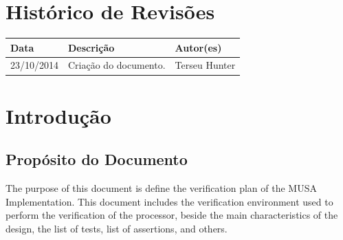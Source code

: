 \documentclass{article}
\begin{document}
\capa

  \section*{\center Histórico de Revisões}
  \vspace*{1cm}
  \begin{center} %
    \begin{longtable}[pos]{|m{2cm} | m{7.2cm} | m{3.8cm}|} 
      \hline %
      \cellcolor[gray]{0.9}
      \textbf{Data} & \cellcolor[gray]{0.9}\textbf{Descrição} & \cellcolor[gray]{0.9}\textbf{Autor(es)}\\ \hline
      \hline
      \small 23/10/2014 & \small Criação do documento. & \small Terseu Hunter \\ \hline 
    \end{longtable}
  \end{center}

  \newpage
  \tableofcontents
  \newpage

  \section{Introdução}

	\subsection{Propósito do Documento}
	The purpose of this document is define the verification plan of the MUSA Implementation. This document includes the verification environment used to perform the verification of the processor, beside the main characteristics of the design, the list of tests, list of assertions, and others.
	
\end{document}
